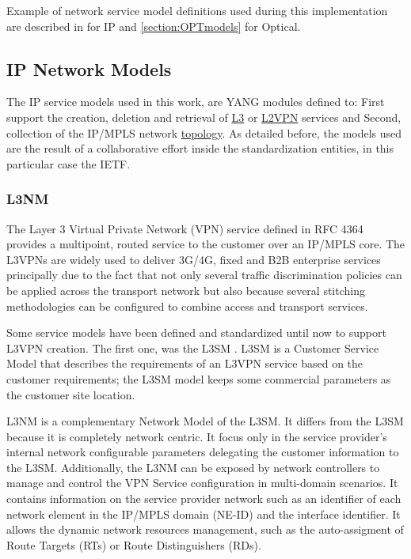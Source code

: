 \documentclass[a4paper,fleqn]{cas-dc}
\begin{document}
Example of network service model definitions used during this implementation are described in  for IP and \cref{section:OPTmodels} for Optical.

\subsection{IP Network Models}
\label{section:IPmodels}

The IP service models used in this work, are YANG modules defined to: First support the creation, deletion and retrieval of \hyperref[section:l3nm]{L3} or \hyperref[section:l2nm]{L2VPN} services and Second, collection of the IP/MPLS network \hyperref[subsection:IPtopo]{topology}. As detailed before, the models used are the result of a collaborative effort inside the standardization entities, in this particular case the IETF.

\subsubsection{L3NM}
\label{section:l3nm}
The Layer 3 Virtual Private Network (VPN) service defined in RFC 4364 \cite{rosen2006rfc} provides a multipoint, routed service to the customer over an IP/MPLS core. The L3VPNs are widely used to deliver 3G/4G, fixed and B2B enterprise services principally due to the fact that not only several traffic discrimination policies can be applied across the transport network but also because several stitching methodologies can be configured to combine access and transport services. 

Some service models have been defined and standardized until now to support L3VPN creation. The first one, was the L3SM \cite{rfc8299}. L3SM is a Customer Service Model that describes the requirements of an L3VPN service based on the customer requirements; the L3SM model keeps some commercial parameters as the customer site location.

L3NM \cite{voyer2019internet} is a complementary Network Model of the L3SM. It differs from the L3SM because it is completely network centric. It focus only in the service provider's internal network configurable parameters delegating the customer information to the L3SM. Additionally, the L3NM can be exposed by network controllers to manage and control the VPN Service configuration in multi-domain scenarios. It contains information on the service provider network such as an identifier of each network element in the IP/MPLS domain (NE-ID) and the interface identifier. It allows the dynamic network resources management, such as the auto-assigment of Route Targets (RTs) or Route Distinguishers (RDs).
\end{document}
